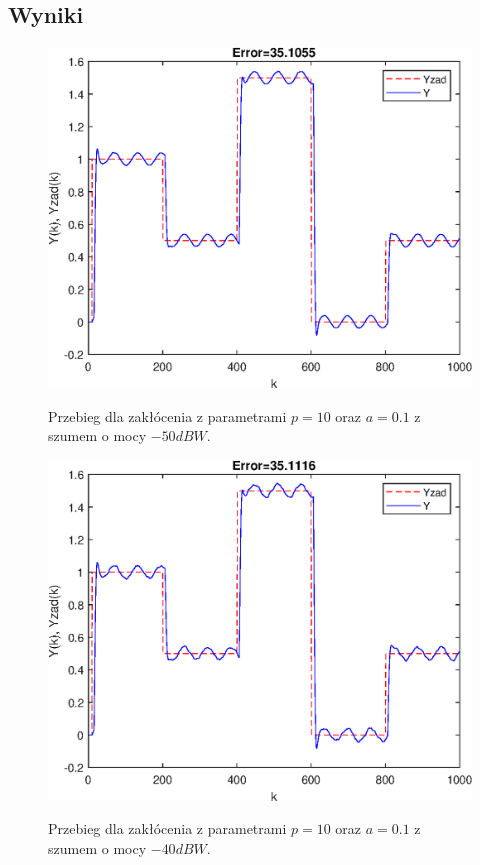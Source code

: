 \subsection{Wyniki}
\begin{figure}[h!]
	\centering
	\includegraphics[scale=1]{Rys/szum-50}
	\label{fig:szum-50}
	\caption{Przebieg dla zakłócenia z parametrami $p=10$ oraz $a=0.1$ z szumem o mocy $-50 dBW$.}
\end{figure}
\begin{figure}[h!]
	\centering
	\includegraphics[scale=1]{Rys/szum-40}
	\label{fig:szum-40}
	\caption{Przebieg dla zakłócenia z parametrami $p=10$ oraz $a=0.1$ z szumem o mocy $-40 dBW$.}
\end{figure}
